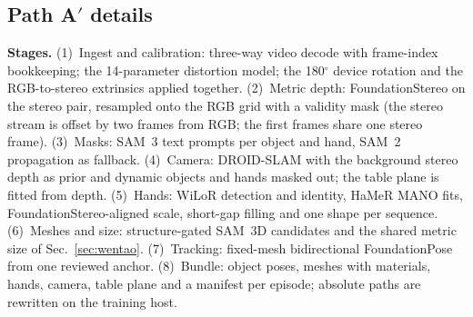 \subsection{Path A$'$ details}
\label{app:patha-prime}
\textbf{Stages.} (1)~Ingest and calibration: three-way video decode with frame-index
bookkeeping; the 14-parameter distortion model; the 180$^\circ$ device rotation and the
RGB-to-stereo extrinsics applied together. (2)~Metric depth: FoundationStereo on the stereo pair,
resampled onto the RGB grid with a validity mask (the stereo stream is offset by two frames from
RGB; the first frames share one stereo frame). (3)~Masks: SAM~3 text prompts per object and hand,
SAM~2 propagation as fallback. (4)~Camera: DROID-SLAM with the background stereo depth as prior
and dynamic objects and hands masked out; the table plane is fitted from depth. (5)~Hands: WiLoR
detection and identity, HaMeR MANO fits, FoundationStereo-aligned scale, short-gap filling and one
shape per sequence. (6)~Meshes and size: structure-gated SAM~3D candidates and the shared metric
size of Sec.~\ref{sec:wentao}. (7)~Tracking: fixed-mesh bidirectional FoundationPose from one
reviewed anchor. (8)~Bundle: object poses, meshes with materials, hands, camera, table plane and a
manifest per episode; absolute paths are rewritten on the training host.

